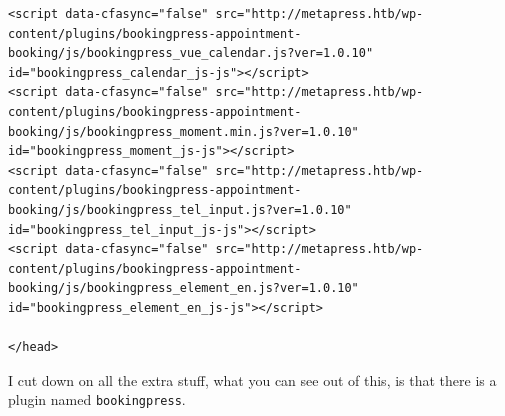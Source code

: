 \documentclass[11pt]{article}
\begin{document}
\begin{enumerate}
\begin{enumerate}
\begin{verbatim}
<script data-cfasync="false" src="http://metapress.htb/wp-content/plugins/bookingpress-appointment-booking/js/bookingpress_vue_calendar.js?ver=1.0.10" id="bookingpress_calendar_js-js"></script>
<script data-cfasync="false" src="http://metapress.htb/wp-content/plugins/bookingpress-appointment-booking/js/bookingpress_moment.min.js?ver=1.0.10" id="bookingpress_moment_js-js"></script>
<script data-cfasync="false" src="http://metapress.htb/wp-content/plugins/bookingpress-appointment-booking/js/bookingpress_tel_input.js?ver=1.0.10" id="bookingpress_tel_input_js-js"></script>
<script data-cfasync="false" src="http://metapress.htb/wp-content/plugins/bookingpress-appointment-booking/js/bookingpress_element_en.js?ver=1.0.10" id="bookingpress_element_en_js-js"></script>

</head>
\end{verbatim}
I cut down on all the extra stuff, what you can see out of this, is that there is a plugin named \texttt{bookingpress}.
\end{enumerate}
\end{enumerate}
\end{document}
